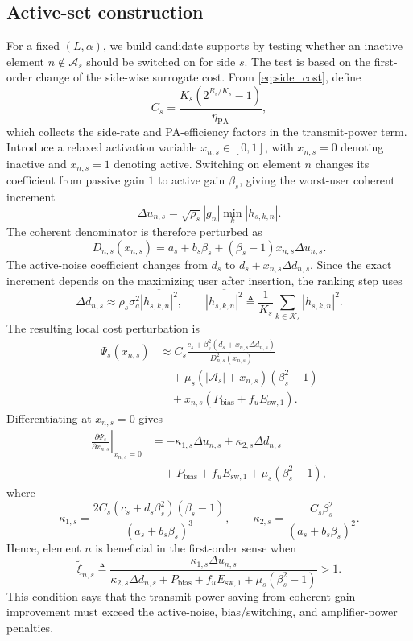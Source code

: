\documentclass[journal]{IEEEtran}
\begin{document}
\subsection{Active-set construction}
For a fixed $(L,\alpha)$, we build candidate supports by testing whether an inactive element $n\notin\mathcal{A}_s$ should be switched on for side $s$. The test is based on the first-order change of the side-wise surrogate cost. From \eqref{eq:side_cost}, define
\[
C_s=\frac{K_s(2^{R_s/K_s}-1)}{\eta_{\mathrm{PA}}},
\]
which collects the side-rate and PA-efficiency factors in the transmit-power term. Introduce a relaxed activation variable $x_{n,s}\in[0,1]$, with $x_{n,s}=0$ denoting inactive and $x_{n,s}=1$ denoting active. Switching on element $n$ changes its coefficient from passive gain $1$ to active gain $\beta_s$, giving the worst-user coherent increment
\[
\Delta u_{n,s}=\sqrt{\rho_s}|g_n|\min_k|h_{s,k,n}|.
\]
The coherent denominator is therefore perturbed as
\[
D_{n,s}(x_{n,s})=a_s+b_s\beta_s+(\beta_s-1)x_{n,s}\Delta u_{n,s}.
\]
The active-noise coefficient changes from $d_s$ to $d_s+x_{n,s}\Delta d_{n,s}$. Since the exact increment depends on the maximizing user after insertion, the ranking step uses
\[
\Delta d_{n,s}\approx \rho_s\sigma_a^2\overline{|h_{s,k,n}|^2},\qquad
\overline{|h_{s,k,n}|^2}\triangleq \frac{1}{K_s}\sum_{k\in\mathcal{K}_s}|h_{s,k,n}|^2.
\]
The resulting local cost perturbation is
\[
\begin{aligned}
\Psi_s(x_{n,s})
&\approx
C_s\frac{c_s+\beta_s^2(d_s+x_{n,s}\Delta d_{n,s})}{D_{n,s}^2(x_{n,s})} \\
&\quad +\mu_s(|\mathcal{A}_s|+x_{n,s})(\beta_s^2-1)\\
&\quad +x_{n,s}(P_{\mathrm{bias}}+f_uE_{\mathrm{sw},1}).
\end{aligned}
\]
Differentiating at $x_{n,s}=0$ gives
\[
\begin{aligned}
\left.\frac{\partial \Psi_s}{\partial x_{n,s}}\right|_{x_{n,s}=0}
&= -\kappa_{1,s}\Delta u_{n,s}+\kappa_{2,s}\Delta d_{n,s} \\
&\quad +P_{\mathrm{bias}}+f_uE_{\mathrm{sw},1}
+\mu_s(\beta_s^2-1),
\end{aligned}
\]
where
\[
\kappa_{1,s}=\frac{2C_s(c_s+d_s\beta_s^2)(\beta_s-1)}{(a_s+b_s\beta_s)^3},
\qquad
\kappa_{2,s}=\frac{C_s\beta_s^2}{(a_s+b_s\beta_s)^2}.
\]
Hence, element $n$ is beneficial in the first-order sense when
\[
\tilde{\xi}_{n,s}\triangleq
\frac{\kappa_{1,s}\Delta u_{n,s}}
{\kappa_{2,s}\Delta d_{n,s}+P_{\mathrm{bias}}+f_uE_{\mathrm{sw},1}+\mu_s(\beta_s^2-1)} > 1.
\]
This condition says that the transmit-power saving from coherent-gain improvement must exceed the active-noise, bias/switching, and amplifier-power penalties.
\end{document}
